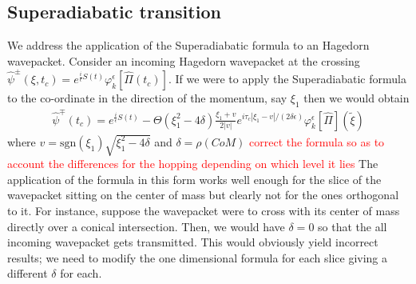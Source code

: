 \documentclass[12pt]{article}
\numberwithin{equation}{section}
\begin{document}
      \subsection{Superadiabatic transition}
      We address the application of the Superadiabatic formula to an Hagedorn 
      wavepacket. Consider an incoming Hagedorn wavepacket 
      at the crossing 
      $\hat{\psi}^{\pm}(\xi,t_c) 
      = 
      e^{\frac{i}{\epsilon}S(t)}
      \varphi_{k}^\epsilon[\hat{\Pi}(t_c)]$. If we were to apply the 
      Superadiabatic formula to the co-ordinate in the direction of the 
      momentum, say $\xi_1$ then we would obtain 
      \begin{equation}
        \begin{split}
          \hat{\psi}^{\mp}(t_c)
          =
          e^{\frac{i}{\epsilon}S(t)}
          - \Theta(\xi_1^2 - 4 \delta)
          \frac{\xi_1 + v }{2 |v|} 
          e^{i \tau_c |\xi_1 - v| / (2  \delta \epsilon)}
            \varphi_{k}^\epsilon[\hat{\Pi}](\tilde{\xi})  
        \end{split}
      \end{equation}
      where $v = \text{sgn}(\xi_1) \sqrt{\xi_1^2 - 4 \delta}$ and $\delta = \rho(CoM)$
      \textcolor{red}{correct the formula so as to account the differences for 
      the hopping depending on which level it lies}
      The application of the formula in this form works well enough for the slice 
      of the wavepacket sitting on the center of mass but clearly not for the ones 
      orthogonal to it. For instance, suppose the wavepacket were to cross 
      with its center of mass directly over a conical intersection. Then, we would 
      have $\delta=0$ so that the all incoming wavepacket gets transmitted. This would 
      obviously yield incorrect results; we need to modify the one dimensional 
      formula for each slice giving a different $\delta$ for each. 
        
\end{document}
